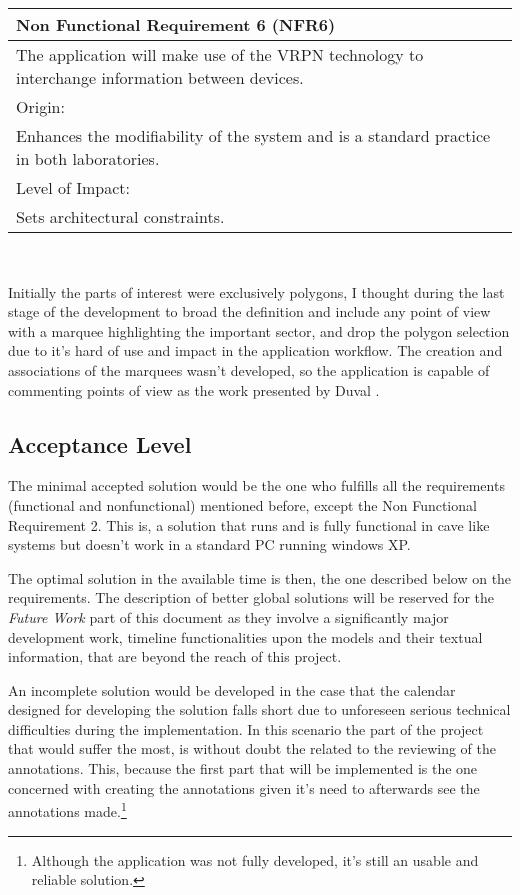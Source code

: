 \begin{center}
\begin{tabular}{p{12.6cm}}
	\hline
	{\Large Non Functional Requirement 6 (NFR6)}\\ \hline \hline
	The application will make use of the VRPN technology to interchange information between devices. \\ \hline
	\large{Origin:}\\ \hline
	Enhances the modifiability of the system and is a standard practice in both laboratories.\\ \hline \hline
	\large{Level of Impact:}\\ \hline
	Sets architectural constraints.\\
	\hline
\end{tabular}\\
\vspace{10mm}


\end{center}

Initially the parts of interest were exclusively polygons, I thought during the last stage of the development to broad the definition and include any point of view with a marquee highlighting the important sector, and drop the polygon selection due to it's hard of use and impact in the application workflow. The creation and associations of the marquees wasn't developed, so the application is capable of commenting points of view as the work presented by Duval \cite{Duval}.

\subsection{Acceptance Level}

The minimal accepted solution would be the one who fulfills all the requirements (functional and nonfunctional) mentioned before, except the Non Functional Requirement 2. This is, a solution that runs and is fully functional in cave like systems but doesn't work in a standard PC running windows XP.  

The optimal solution in the available time is then, the one described below on the requirements. The description of better global solutions will be reserved for the \emph{Future Work} part of this document as they involve a significantly major development work, timeline functionalities upon the models and their textual information, that are beyond the reach of this project.

An incomplete solution would be developed in the case that the calendar designed for developing the solution falls short due to unforeseen serious technical difficulties during the implementation. In this scenario the part of the project that would suffer the most, is without doubt the related to the reviewing of the annotations. This, because the first part that will be implemented is the one concerned with creating the annotations given it's need to afterwards see the annotations made.\footnote{Although the application was not fully developed, it's still an usable and reliable solution.}

